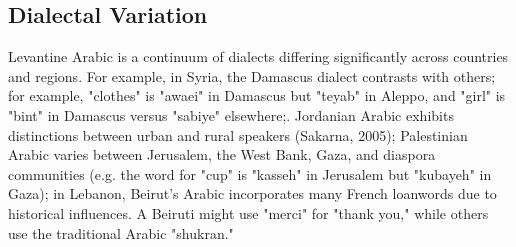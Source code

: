 \documentclass[11pt]{article}
\begin{document}
\subsection{Dialectal Variation}






Levantine Arabic is a continuum of dialects differing significantly across countries and regions. For example, in Syria, the Damascus dialect contrasts with others; for example, "clothes" is "awaei" in Damascus but "teyab" in Aleppo, and "girl" is "bint" in Damascus versus "sabiye" elsewhere;. Jordanian Arabic exhibits distinctions between urban and rural speakers (Sakarna, 2005); Palestinian Arabic varies between Jerusalem, the West Bank, Gaza, and diaspora communities (e.g. the word for "cup" is "kasseh" in Jerusalem but "kubayeh" in Gaza); in Lebanon, Beirut's Arabic incorporates many French loanwords due to historical influences. A Beiruti might use "merci" for "thank you," while others use the traditional Arabic "shukran." 
\end{document}
